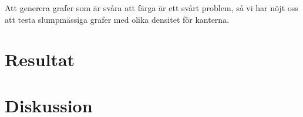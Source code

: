 \documentclass[a4paper]{report}
\begin{document}
Att generera grafer som är svåra att färga är ett svårt problem, så vi har nöjt oss att testa slumpmässiga grafer med olika densitet för kanterna.

\chapter{Resultat}
\chapter{Diskussion}

\nocite{VanLint:2006}

{}
\end{document}
